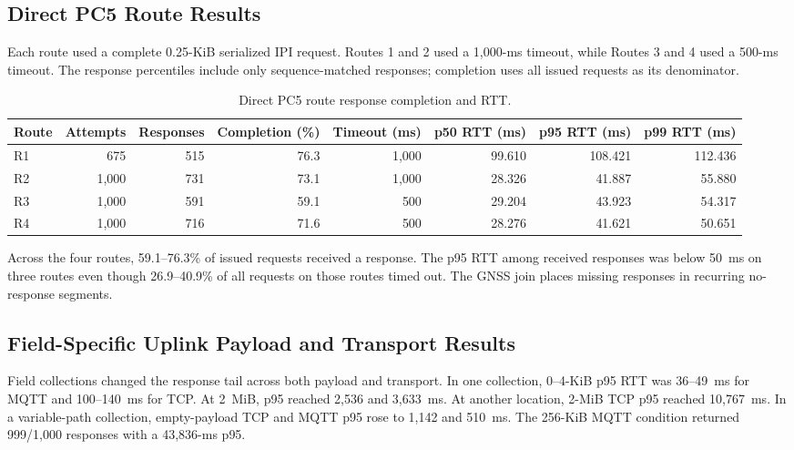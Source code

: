 \subsection{Direct PC5 Route Results}

Each route used a complete 0.25-KiB serialized IPI request. Routes 1 and
2 used a 1,000-ms timeout, while Routes 3 and 4 used a 500-ms timeout. The
response percentiles include only sequence-matched responses; completion uses
all issued requests as its denominator.

\begin{table}[t]
  \caption{Direct PC5 route response completion and RTT.}
  \label{tab:pc5-route-results}
  \centering
  \scriptsize
  \setlength{\tabcolsep}{4.0pt}
  \begin{tabular}{@{}lrrrrrrr@{}}
    \toprule
    Route & Attempts & Responses & Completion (\%) & Timeout (ms) & p50 RTT (ms) & p95 RTT (ms) & p99 RTT (ms) \\
    \midrule
    R1 & 675 & 515 & 76.3 & 1,000 & 99.610 & 108.421 & 112.436 \\
    R2 & 1,000 & 731 & 73.1 & 1,000 & 28.326 & 41.887 & 55.880 \\
    R3 & 1,000 & 591 & 59.1 & 500 & 29.204 & 43.923 & 54.317 \\
    R4 & 1,000 & 716 & 71.6 & 500 & 28.276 & 41.621 & 50.651 \\
    \bottomrule
  \end{tabular}
\end{table}

Across the four routes, 59.1--76.3\% of issued requests received a response.
The p95 RTT among received responses was below 50~ms on three routes even
though 26.9--40.9\% of all requests on those routes timed out. The GNSS join
places missing responses in recurring no-response segments.

\subsection{Field-Specific Uplink Payload and Transport Results}

Field collections changed the response tail across both payload and transport.
In one collection, 0--4-KiB p95 RTT was 36--49~ms for MQTT and 100--140~ms for
TCP. At 2~MiB, p95 reached 2,536 and 3,633~ms. At another location, 2-MiB TCP
p95 reached 10,767~ms. In a variable-path collection, empty-payload TCP and
MQTT p95 rose to 1,142 and 510~ms. The 256-KiB MQTT condition returned
999/1,000 responses with a 43,836-ms p95.

